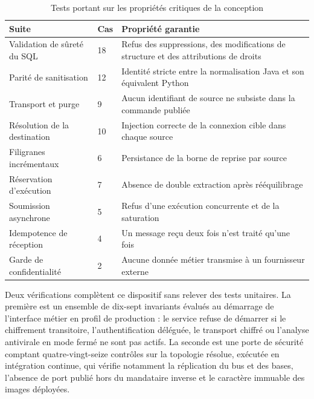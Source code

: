 \begin{table}[htbp]
\centering
\caption{Tests portant sur les propriétés critiques de la conception}
\label{tab:tests-critiques}
\small
\begin{tabularx}{\textwidth}{|p{4.4cm}|p{1.4cm}|X|}
\hline
\textbf{Suite} & \textbf{Cas} & \textbf{Propriété garantie} \\ \hline

Validation de sûreté du SQL & 18 & Refus des suppressions, des modifications de
structure et des attributions de droits \\ \hline
Parité de sanitisation & 12 & Identité stricte entre la normalisation Java et son
équivalent Python \\ \hline
Transport et purge & 9 & Aucun identifiant de source ne subsiste dans la commande
publiée \\ \hline
Résolution de la destination & 10 & Injection correcte de la connexion cible dans
chaque source \\ \hline
Filigranes incrémentaux & 6 & Persistance de la borne de reprise par source \\ \hline
Réservation d'exécution & 7 & Absence de double extraction après rééquilibrage \\ \hline
Soumission asynchrone & 5 & Refus d'une exécution concurrente et de la saturation \\ \hline
Idempotence de réception & 4 & Un message reçu deux fois n'est traité qu'une fois \\ \hline
Garde de confidentialité & 2 & Aucune donnée métier transmise à un fournisseur
externe \\ \hline

\end{tabularx}
\end{table}

Deux vérifications complètent ce dispositif sans relever des tests unitaires. La
première est un ensemble de dix-sept invariants évalués au démarrage de
l'interface métier en profil de production : le service refuse de démarrer si le
chiffrement transitoire, l'authentification déléguée, le transport chiffré ou
l'analyse antivirale en mode fermé ne sont pas actifs. La seconde est une porte de
sécurité comptant quatre-vingt-seize contrôles sur la topologie résolue, exécutée
en intégration continue, qui vérifie notamment la réplication du bus et des bases,
l'absence de port publié hors du mandataire inverse et le caractère immuable des
images déployées.



